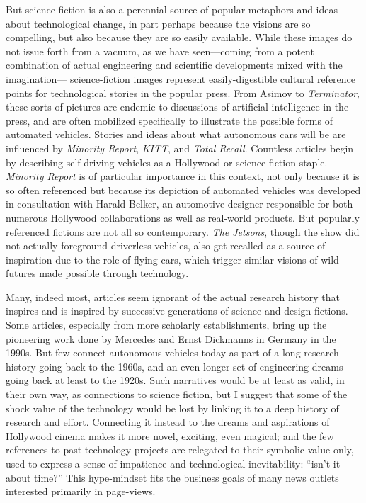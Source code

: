 But science fiction is also a perennial source of popular metaphors and ideas
about technological change, in part perhaps because the visions are so
compelling, but also because they are so easily available. While these images
do not issue forth from a vacuum, as we have seen---coming from a potent combination
of actual engineering and scientific developments mixed with the imagination---
science-fiction images represent easily-digestible cultural reference
points for technological stories in the popular press. From Asimov to \emph{Terminator},
these sorts of pictures are endemic to discussions of artificial
intelligence in the press, and are often mobilized specifically to
illustrate the possible forms of automated vehicles. Stories and ideas
about what autonomous cars will be are
influenced by \emph{Minority Report}\cite{fromHollywood}, \emph{KITT}\cite{wadeKITT}, and \emph{Total
  Recall}.\cite{pasdirtzSolution} Countless articles begin by describing
self-driving vehicles as a Hollywood or science-fiction
staple.\cite{scifiToReality} \emph{Minority Report} is of particular
importance in this context, not only because it is so often referenced
but because its depiction of automated vehicles was developed in
consultation with Harald Belker, an automotive designer responsible
for both numerous Hollywood collaborations as well as real-world
products.\cite{melansonMinority} But popularly referenced fictions are
not all so contemporary. \emph{The Jetsons}, though
the show did not actually foreground driverless vehicles, also get
recalled as a source of inspiration due to the role of flying cars,
which trigger similar visions of wild 
futures made possible through technology.\cite{JetsonsAge} 


Many, indeed most, articles seem ignorant of the actual research
history that inspires and is inspired by successive generations of
science and design fictions. Some articles, especially from more
scholarly establishments, bring up 
the pioneering work done by Mercedes and Ernst
Dickmanns in Germany in the 1990s.\cite{HCRIDriverless} But few connect
autonomous vehicles today as part of a long research history going
back to the 1960s, and an even longer set of engineering dreams going
back at least to the 1920s. Such narratives would be at least as
valid, in their own way, as connections to science fiction, but I
suggest that some of the shock value of the technology would be lost
by linking it to a deep history of research and effort. Connecting it
instead to the dreams and aspirations of Hollywood cinema makes it
more novel, exciting, even magical; and the few references to past
technology projects are relegated to their symbolic value only, used
to express a sense of impatience and technological inevitability: ``isn't
it about time?'' This hype-mindset fits the business
goals of many news outlets interested primarily in page-views.

